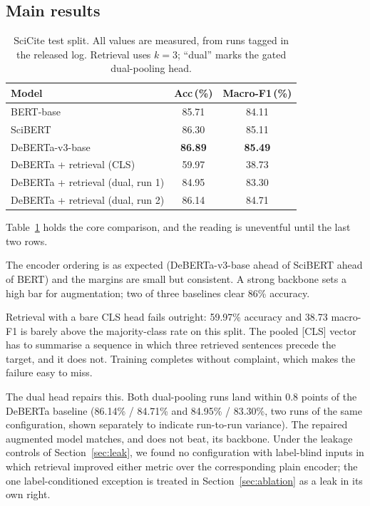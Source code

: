 \documentclass[10pt,twocolumn,twoside]{article}
\begin{document}
\subsection{Main results}\label{sec:mainresults}

\begin{table}[t]
\caption{SciCite test split. All values are measured, from runs tagged in the
released log. Retrieval uses $k{=}3$; ``dual'' marks the gated dual-pooling
head.}
\label{tab:main}
\begin{center}
\small
\begin{tabular}{lcc}
\toprule
\textbf{Model} & \textbf{Acc\,(\%)} & \textbf{Macro-F1\,(\%)}\\
\midrule
BERT-base                    & 85.71 & 84.11\\
SciBERT                      & 86.30 & 85.11\\
DeBERTa-v3-base              & \textbf{86.89} & \textbf{85.49}\\
\midrule
DeBERTa + retrieval (CLS)    & 59.97 & 38.73\\
DeBERTa + retrieval (dual, run 1) & 84.95 & 83.30\\
DeBERTa + retrieval (dual, run 2) & 86.14 & 84.71\\
\bottomrule
\end{tabular}
\end{center}
\end{table}

Table~\ref{tab:main} holds the core comparison, and the reading is
uneventful until the last two rows.

The encoder ordering is as expected (DeBERTa-v3-base ahead of SciBERT ahead
of BERT) and the margins are small but consistent. A strong backbone sets a
high bar for augmentation; two of three baselines clear 86\% accuracy.

Retrieval with a bare CLS head fails outright: 59.97\% accuracy and 38.73
macro-F1 is barely above the majority-class rate on this split. The pooled
[CLS] vector has to summarise a sequence in which three retrieved sentences
precede the target, and it does not. Training completes without complaint,
which makes the failure easy to miss.

The dual head repairs this. Both dual-pooling runs land within 0.8 points of
the DeBERTa baseline (86.14\% / 84.71\% and 84.95\% / 83.30\%, two runs of the
same configuration, shown separately to indicate run-to-run variance). The
repaired augmented model matches, and does not beat, its backbone. Under the
leakage controls of Section~\ref{sec:leak}, we found no configuration with
label-blind inputs in which retrieval improved either metric over the
corresponding plain encoder; the one label-conditioned exception is treated
in Section~\ref{sec:ablation} as a leak in its own right.
\end{document}
